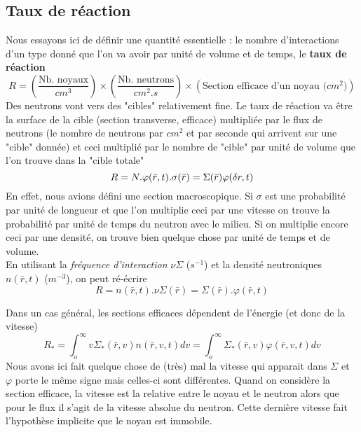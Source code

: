\subsection{Taux de réaction}
Nous essayons ici de définir une quantité essentielle : le nombre d'interactions d'un type donné 
que l'on va avoir par unité de volume et de temps, le \textbf{taux de réaction}
\begin{equation}
R = \left(\dfrac{\text{Nb. noyaux}}{cm^3}\right)\times\left(\dfrac{\text{Nb. neutrons}}{cm^2.s}\right)
\times\left(\text{Section efficace d'un noyau ($cm^2$)}\right)
\end{equation}
Des neutrons vont vers des "cibles" relativement fine. Le taux de réaction va être la surface de 
la cible (section transverse, efficace) multipliée par le flux de neutrons (le nombre de neutrons 
par $cm^2$ et par seconde qui arrivent sur une "cible" donnée) et ceci multiplié par le nombre de 
"cible" par unité de volume que l'on trouve dans la "cible totale"
\begin{equation}
R = N.\varphi(\bar r,t).\sigma(\bar r) = \Sigma(\bar r)\varphi(\var r, t)
\end{equation}
En effet, nous avions défini une section macroscopique. Si $\sigma$ est une probabilité par 
unité de longueur et que l'on multiplie ceci par une vitesse on trouve la probabilité par unité 
de temps du neutron avec le milieu. Si on multiplie encore ceci par une densité, on trouve bien 
quelque chose par unité de temps et de volume.\\

En utilisant la \textit{fréquence d'interaction} $\nu\Sigma$ ($s^{-1}$) et la densité 
neutroniques $n(\bar r,t)$ ($m^{-3}$), on peut ré-écrire
\begin{equation}
R = n(\bar r,t).\nu\Sigma(\bar r) = \Sigma(\bar r).\varphi(\bar r,t)
\end{equation}

Dans un cas général, les sections efficaces dépendent de l'énergie (et donc de la vitesse)
\begin{equation}
{R_*} = \int_o^\infty     v{\Sigma _*}(\bar r,v)n(\bar r,v,t)dv = \int_o^\infty     {\Sigma _*}(\bar r,v)\varphi (\bar r,v,t)dv
\end{equation}
Nous avons ici fait quelque chose de (très) mal la vitesse qui apparait dans $\Sigma$ et $\varphi$
porte le même signe mais celles-ci sont différentes. Quand on considère la section efficace, la vitesse est la relative entre le noyau et le neutron alors que pour le flux il s'agit de la vitesse 
absolue du neutron. Cette dernière vitesse fait l'hypothèse implicite que le noyau est immobile.\\

